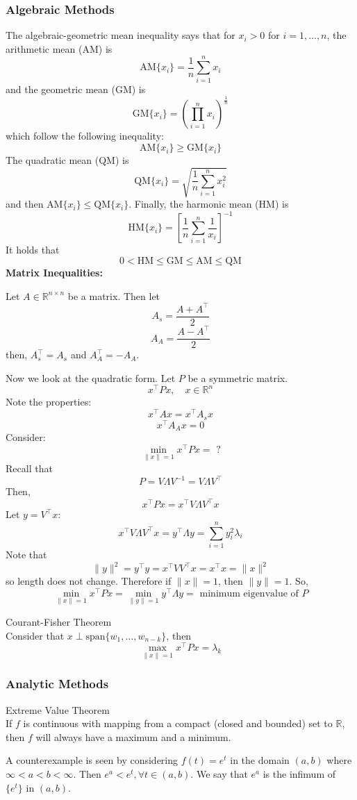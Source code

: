 \documentclass{article}
\begin{document}
\subsubsection{Algebraic Methods}

The algebraic-geometric mean inequality says that for $x_i > 0$ for $i = 1,\ldots,n$,
the arithmetic mean (AM) is
\[\text{AM}\{x_i\} = \frac{1}{n}\sum_{i=1}^{n}x_i\]
and the geometric mean (GM) is
\[\text{GM}\{x_i\} = \left(\prod_{i=1}^{n}x_i\right)^\frac{1}{n}\]
which follow the following inequality:
\[\text{AM}\{x_i\} \ge \text{GM}\{x_i\}\]
The quadratic mean (QM) is
\[\text{QM}\{x_i\} = \sqrt{\frac{1}{n}\sum_{i=1}^{n}x_i^2}\]
and then $\text{AM}\{x_i\} \le \text{QM}\{x_i\}$.
Finally, the harmonic mean (HM) is
\[\text{HM}\{x_i\} = \left[\frac{1}{n}\sum_{i=1}^{n}\frac{1}{x_i}\right]^{-1}\]
It holds that
\[0 < \text{HM} \le \text{GM} \le \text{AM} \le \text{QM}\]
\textbf{Matrix Inequalities:}

\noindent
Let $A \in \mathbb{R}^{n\times n}$ be a matrix. Then let
\[A_s = \frac{A+A^\top}{2}\]
\[A_A = \frac{A-A^\top}{2}\]
then, $A_s^\top = A_s$ and $A_A^\top = -A_A$.

\noindent
Now we look at the quadratic form. Let $P$ be a symmetric matrix.
\[x^\top Px, \quad x \in \mathbb{R}^{n}\]
Note the properties:
\[x^\top Ax = x^\top A_s x\]
\[x^\top A_A x = 0\]
Consider:
\[\min_{\|x\|=1}x^\top Px =\text{ ?}\]
Recall that
\[P = V\Lambda V^{-1} = V\Lambda V^\top\]
Then,
\[x^\top Px = x^\top V\Lambda V^\top x\]
Let $y = V^\top x$:
\[x^\top V\Lambda V^\top x = y^\top \Lambda y = \sum_{i=1}^{n}y_i^2\lambda_i\]
Note that
\[\|y\|^2 = y^\top y = x^\top V V^\top x = x^\top x = \|x\|^2\]
so length does not change. Therefore if $\|x\| = 1$, then $\|y\| = 1$.
So,
\[\min_{\|x\|=1}x^\top Px = \min_{\|y\|=1}y^\top \Lambda y =\text{ minimum eigenvalue of }P\]
\begin{theorem}
    Courant-Fisher Theorem\\[2mm]
    Consider that $x \perp \text{span}\{w_1,\ldots,w_{n-k}\}$, then
    \[\max_{\|x\|=1}x^\top Px = \lambda_k\]
\end{theorem}

\subsubsection{Analytic Methods}

\begin{theorem}
    Extreme Value Theorem\\[2mm]
    If $f$ is continuous with mapping from a compact (closed and bounded) set to $\mathbb{R}$, then
    $f$ will always have a maximum and a minimum.
\end{theorem}
\noindent
A counterexample is seen by considering $f(t) = e^t$ in the domain $(a, b)$
where $\infty < a < b < \infty$. Then $e^a < e^t, \forall t \in (a, b)$.
We say that $e^a$ is the infimum of $\{e^t\}$ in $(a,b)$.
\end{document}
